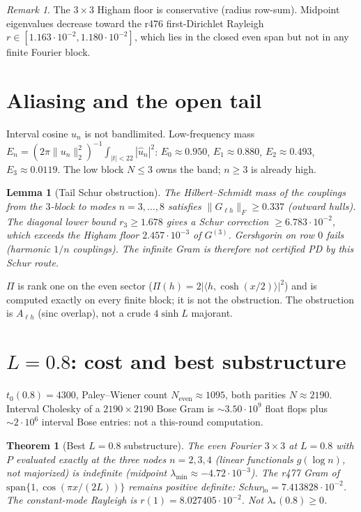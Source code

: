 \documentclass[11pt]{article}
\newtheorem{lemma}{Lemma}
\newtheorem{theorem}{Theorem}
\theoremstyle{remark}
\newtheorem{remark}{Remark}
\begin{document}
\begin{remark}
The $3\times3$ Higham floor is conservative
(radius row-sum).  Midpoint eigenvalues decrease toward the
r476 first-Dirichlet Rayleigh
$r\in[1.163\cdot10^{-2},1.180\cdot10^{-2}]$, which lies
in the closed even span but not in any finite Fourier block.
\end{remark}

\section{Aliasing and the open tail}

Interval cosine $u_n$ is not bandlimited.
Low-frequency mass
$E_n=(2\pi\|u_n\|_2^2)^{-1}\int_{|t|<22}|\hat u_n|^2$:
$E_0\approx0.950$, $E_1\approx0.880$, $E_2\approx0.493$,
$E_3\approx0.0119$.  The low block $N\le3$ owns the band;
$n\ge3$ is already high.

\begin{lemma}[Tail Schur obstruction]\label{lem:tail}
The Hilbert--Schmidt mass of the couplings from the $3$-block
to modes $n=3,\dots,8$ satisfies
$\|G_{\ell h}\|_F\ge0.337$ (outward hulls).
The diagonal lower bound $r_3\ge1.678$ gives a Schur
correction $\ge6.783\cdot10^{-2}$, which exceeds the
Higham floor $2.457\cdot10^{-3}$ of $G^{(3)}$.
Gershgorin on row $0$ fails (harmonic $1/n$ couplings).
The infinite Gram is therefore not certified PD by this
Schur route.
\end{lemma}

$\Pi$ is rank one on the even sector
($\Pi(h)=2|\langle h,\cosh(x/2)\rangle|^2$) and is computed
exactly on every finite block; it is not the obstruction.
The obstruction is $A_{\ell h}$ (sinc overlap), not a crude
$4\sinh L$ majorant.

\section{$L=0.8$: cost and best substructure}

$t_0(0.8)=4300$, Paley--Wiener count
$N_{\mathrm{even}}\approx1095$, both parities $N\approx2190$.
Interval Cholesky of a $2190\times2190$ Bose Gram is
$\sim3.50\cdot10^9$ float flops plus $\sim 2\cdot10^6$
interval Bose entries: not a this-round computation.

\begin{theorem}[Best $L=0.8$ substructure]\label{thm:B}
The even Fourier $3\times3$ at $L=0.8$ with $P$ evaluated
exactly at the three nodes $n=2,3,4$
(linear functionals $g(\log n)$, not majorized)
is indefinite (midpoint $\lambda_{\min}\approx-4.72\cdot10^{-3}$).
The r477 Gram of
$\mathrm{span}\{1,\cos(\pi x/(2L))\}$ remains positive
definite: Schur$_{\mathrm{lo}}=7.413828\cdot10^{-2}$.
The constant-mode Rayleigh is $r(1)=8.027405\cdot10^{-2}$.
Not $\lambda_*(0.8)\ge0$.
\end{theorem}
\end{document}
